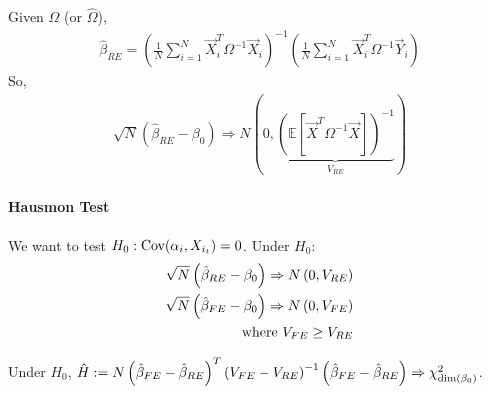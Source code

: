 \documentclass[11pt]{elegantbook}
\begin{document}
Given $\Omega$ (or $\hat{\Omega}$),
\begin{equation}
    \begin{aligned}
        \hat{\beta}_{RE}=\left(\frac{1}{N}\sum_{i=1}^N \vec{X}_i^T \Omega^{-1}\vec{X}_i\right)^{-1}\left(\frac{1}{N}\sum_{i=1}^N \vec{X}_i^T \Omega^{-1}\vec{Y}_i\right)
    \end{aligned}
    \nonumber
\end{equation}
So,
\begin{equation}
    \begin{aligned}
        \sqrt{N}\left(\hat{\beta}_{RE}-\beta_0\right) \Rightarrow N\left(0, \underbrace{(\mathbb{E}[\vec{X}^T\Omega^{-1}\vec{X}])^{-1}}_{V_{RE}}\right)
    \end{aligned}
    \nonumber
\end{equation}
\paragraph*{Hausmon Test} We want to test $H_0: \textnormal{Cov}(\alpha_i,X_{i_t})=0$. Under $H_0$:
\begin{equation}
    \begin{aligned}
        \sqrt{N}\left(\hat{\beta}_{RE}-\beta_0\right) \Rightarrow N\left(0, V_{RE}\right)\\
        \sqrt{N}\left(\hat{\beta}_{FE}-\beta_0\right) \Rightarrow N\left(0, V_{FE}\right)\\
        \textnormal{where }V_{FE}\geq V_{RE}
    \end{aligned}
    \nonumber
\end{equation}
\begin{theorem}
    Under $H_0$, $\hat{H}:=N\left(\hat{\beta}_{FE}-\hat{\beta}_{RE}\right)^T\left(V_{FE}-V_{RE}\right)^{-1}\left(\hat{\beta}_{FE}-\hat{\beta}_{RE}\right)\Rightarrow \chi_{\textnormal{dim}(\beta_0)}^2$.
\end{theorem}
\end{document}
